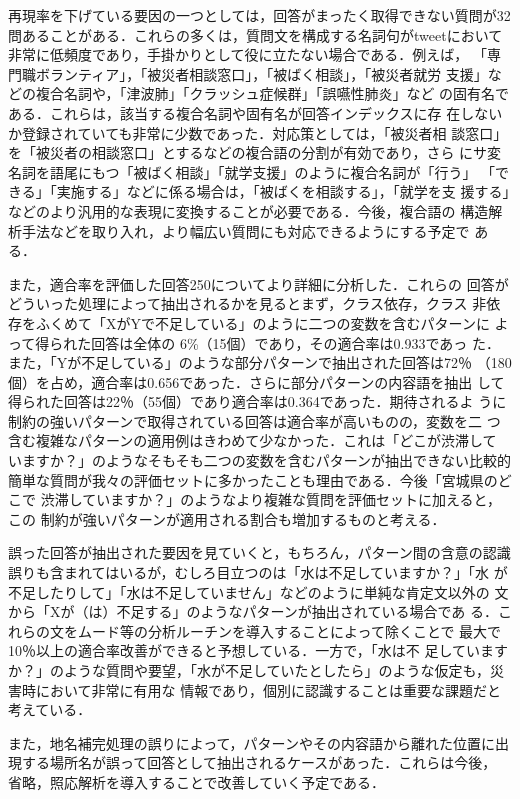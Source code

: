 \documentclass[japanese]{jnlp_1.4}
\begin{document}
再現率を下げている要因の一つとしては，回答がまったく取得できない質問が32
問あることがある．これらの多くは，質問文を構成する名詞句がtweetにおいて
非常に低頻度であり，手掛かりとして役に立たない場合である．例えば，
「専門職ボランティア」，「被災者相談窓口」，「被ばく相談」，「被災者就労
支援」などの複合名詞や，「津波肺」「クラッシュ症候群」「誤嚥性肺炎」など
の固有名である．これらは，該当する複合名詞や固有名が回答インデックスに存
在しないか登録されていても非常に少数であった．対応策としては，「被災者相
談窓口」を「被災者の相談窓口」とするなどの複合語の分割が有効であり，さら
にサ変名詞を語尾にもつ「被ばく相談」「就学支援」のように複合名詞が「行う」
「できる」「実施する」などに係る場合は，「被ばくを相談する」，「就学を支
援する」などのより汎用的な表現に変換することが必要である．今後，複合語の
構造解析手法などを取り入れ，より幅広い質問にも対応できるようにする予定で
ある．

また，適合率を評価した回答250についてより詳細に分析した．これらの
回答がどういった処理によって抽出されるかを見るとまず，クラス依存，クラス
非依存をふくめて「XがYで不足している」のように二つの変数を含むパターンに
よって得られた回答は全体の 6\%（15個）であり，その適合率は0.933であっ
た．また，「Yが不足している」のような部分パターンで抽出された回答は72％
（180個）を占め，適合率は0.656であった．さらに部分パターンの内容語を抽出
して得られた回答は22％（55個）であり適合率は0.364であった．期待されるよ
うに制約の強いパターンで取得されている回答は適合率が高いものの，変数を二
つ含む複雑なパターンの適用例はきわめて少なかった．これは「どこが渋滞して
いますか？」のようなそもそも二つの変数を含むパターンが抽出できない比較的
簡単な質問が我々の評価セットに多かったことも理由である．今後「宮城県のどこで
渋滞していますか？」のようなより複雑な質問を評価セットに加えると，この
制約が強いパターンが適用される割合も増加するものと考える．

誤った回答が抽出された要因を見ていくと，もちろん，パターン間の含意の認識
誤りも含まれてはいるが，むしろ目立つのは「水は不足していますか？」「水
が不足したりして」「水は不足していません」などのように単純な肯定文以外の
文から「Xが（は）不足する」のようなパターンが抽出されている場合であ
る．これらの文をムード等の分析ルーチンを導入することによって除くことで
最大で10％以上の適合率改善ができると予想している．一方で，「水は不
足していますか？」のような質問や要望，「水が不足していたとしたら」のような仮定も，災害時において非常に有用な
情報であり，個別に認識することは重要な課題だと考えている． 

また，地名補完処理の誤りによって，パターンやその内容語から離れた位置に出
現する場所名が誤って回答として抽出されるケースがあった．これらは今後，
省略，照応解析を導入することで改善していく予定である．
\end{document}
